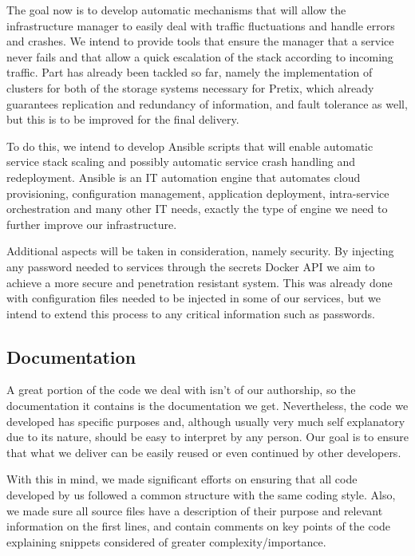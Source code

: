 \documentclass[12pt]{article}
\begin{document}
The goal now is to develop automatic mechanisms that will allow the infrastructure manager to easily deal with traffic fluctuations and handle errors and crashes.
We intend to provide tools that ensure the manager that a service never fails and that allow a quick escalation of the stack according to incoming traffic.
Part has already been tackled so far, namely the implementation of clusters for both of the storage systems necessary for Pretix, which already guarantees 
replication and redundancy of information, and fault tolerance as well, but this is to be improved for the final delivery.

To do this, we intend to develop Ansible scripts that will enable automatic service stack scaling and possibly automatic service crash handling and redeployment.
Ansible \cite{ansible} is an IT automation engine that automates cloud provisioning, configuration management, application deployment, intra-service orchestration 
and many other IT needs, exactly the type of engine we need to further improve our infrastructure.

Additional aspects will be taken in consideration, namely security. 
By injecting any password needed to services through the secrets Docker API we aim to achieve a more secure and penetration resistant system. 
This was already done with configuration files needed to be injected in some of our services, but we intend to extend this process to any critical information 
such as passwords.

\subsection{Documentation} \label{remarks.documentation} %


A great portion of the code we deal with isn't of our authorship, so the documentation it contains is the documentation we get.
Nevertheless, the code we developed has specific purposes and, although usually very much self explanatory due to its nature, should be easy to interpret by any person.
Our goal is to ensure that what we deliver can be easily reused or even continued by other developers.

With this in mind, we made significant efforts on ensuring that all code developed by us followed a common structure with the same coding style.
Also, we made sure all source files have a description of their purpose and relevant information on the first lines, and contain comments on key points of the 
code explaining snippets considered of greater complexity/importance.
\end{document}
